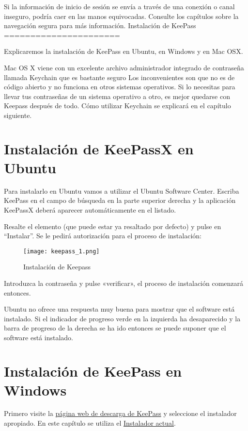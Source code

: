 \documentclass[10pt,a5paper,twoside,,]{book}
\begin{document}
Si la información de inicio de sesión se envía a través de una conexión
o canal inseguro, podría caer en las manos equivocadas. Consulte los
capítulos sobre la navegación segura para más información. Instalación
de KeePass ======================

Explicaremos la instalación de KeePass en Ubuntu, en Windows y en Mac
OSX.

Mac OS X viene con un excelente archivo administrador integrado de
contraseña llamada Keychain que es bastante seguro Los inconvenientes
son que no es de código abierto y no funciona en otros sistemas
operativos. Si lo necesitas para llevar tus contraseñas de un sistema
operativo a otro, es mejor quedarse con Keepass después de todo. Cómo
utilizar Keychain se explicará en el capítulo siguiente.

\section{Instalación de KeePassX en
Ubuntu}\label{instalaciuxf3n-de-keepassx-en-ubuntu}

Para instalarlo en Ubuntu vamos a utilizar el Ubuntu Software Center.
Escriba KeePass en el campo de búsqueda en la parte superior derecha y
la aplicación KeePassX deberá aparecer automáticamente en el listado.

Resalte el elemento (que puede estar ya resaltado por defecto) y pulse
en ``Instalar''. Se le pedirá autorización para el proceso de
instalación:

\begin{figure}[htbp]
\centering
\texttt{[image: keepass\_1.png]}
\caption{Instalación de Keepass}
\end{figure}

Introduzca la contraseña y pulse «verificar», el proceso de instalación
comenzará entonces.

Ubuntu no ofrece una respuesta muy buena para mostrar que el software
está instalado. Si el indicador de progreso verde en la izquierda ha
desaparecido y la barra de progreso de la derecha se ha ido entonces se
puede suponer que el software está instalado.

\section{Instalación de KeePass en
Windows}\label{instalaciuxf3n-de-keepass-en-windows}

Primero visite la \href{http://keepass.info/download.html}{página web de
descarga de KeePass} y seleccione el instalador apropiado. En este
capítulo se utiliza el
\href{http://downloads.sourceforge.net/keepass/KeePass-2.15-Setup.exe}{Instalador
actual}.
\end{document}
